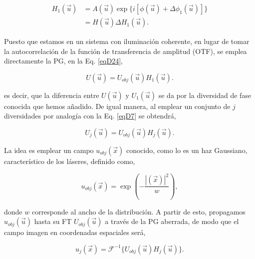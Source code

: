
\begin{equation}
\begin{aligned}
	H_1(\vec{u}) & = A(\vec{u}) \exp\{i [ \phi(\vec{u}) + \Delta \phi_1(\vec{u})] \}\\
	& = H(\vec{u}) \Delta H_1(\vec{u}).
\end{aligned}
\end{equation}

Puesto que estamos en un sistema con iluminación coherente, en lugar de tomar la autocorrelación de la función de transferencia de amplitud (OTF), se emplea directamente la PG, en la Eq. \ref{eqD24},

\begin{equation}
\label{eqD24a}
	U(\vec{u}) = U_{obj}(\vec{u}) H_1(\vec{u}).
\end{equation}

es decir, que la diferencia entre $U(\vec{u})$ y $U_1(\vec{u})$ se da por la diversidad de fase conocida que hemos añadido. De igual manera, al emplear un conjunto de $j$ diversidades por analogía con la Eq. \ref{eqD7} se obtendrá,

\begin{equation}
\label{eq1e}
	U_j(\vec{u}) = U_{obj}(\vec{u}) H_j(\vec{u}).
\end{equation}

La idea es emplear un campo $u_{obj}(\vec{x})$ conocido, como lo es un haz Gaussiano, característico de los láseres, definido como,

\begin{equation}
	u_{obj}(\vec{x}) = \exp \left(-\frac{|(\vec{x})|^2}{ w} \right),
\end{equation}

donde $w$ corresponde al ancho de la distribución. A partir de esto, propagamos $u_{obj}(\vec{u})$ hasta su FT $U_{obj} (\vec{u})$ a través de la PG aberrada, de modo que el campo imagen en coordenadas espaciales será,

\begin{equation}
\label{eqD1x}
	u_j(\vec{x}) = \mathscr{F}^{-1}\{U_{obj}(\vec{u})H_j(\vec{u})\}.
\end{equation}

